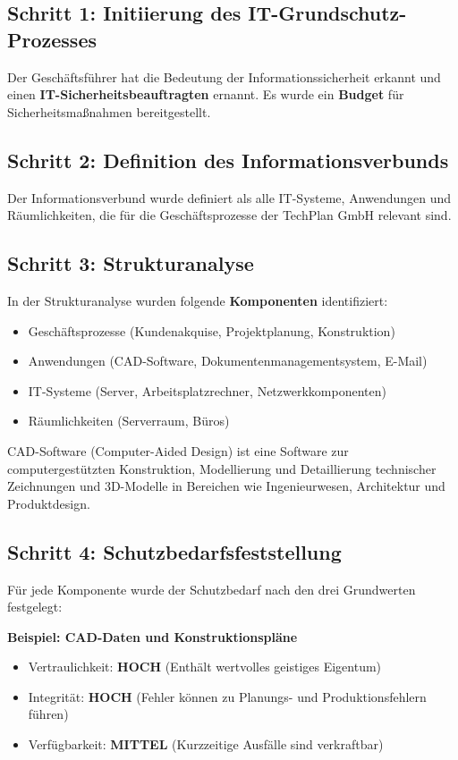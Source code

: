 \documentclass{orgstandard}
\begin{document}
\subsection{Schritt 1: Initiierung des IT-Grundschutz-Prozesses}
\label{sec:org8731209}
Der Geschäftsführer hat die Bedeutung der Informationssicherheit erkannt und einen \textbf{IT-Sicherheitsbeauftragten} ernannt. Es wurde ein \textbf{Budget} für Sicherheitsmaßnahmen bereitgestellt.
\subsection{Schritt 2: Definition des Informationsverbunds}
\label{sec:org49a1d9c}
Der Informationsverbund wurde definiert als alle IT-Systeme, Anwendungen und Räumlichkeiten, die für die Geschäftsprozesse der TechPlan GmbH relevant sind.
\subsection{Schritt 3: Strukturanalyse}
\label{sec:org8c9dd6d}
In der Strukturanalyse wurden folgende \textbf{Komponenten} identifiziert:
\begin{itemize}
\item Geschäftsprozesse (Kundenakquise, Projektplanung, Konstruktion)
\item Anwendungen (CAD-Software, Dokumentenmanagementsystem, E-Mail)
\item IT-Systeme (Server, Arbeitsplatzrechner, Netzwerkkomponenten)
\item Räumlichkeiten (Serverraum, Büros)
\end{itemize}

\begin{NOTES}
CAD-Software (Computer-Aided Design) ist eine Software zur computergestützten Konstruktion, Modellierung und Detaillierung technischer Zeichnungen und 3D-Modelle in Bereichen wie Ingenieurwesen, Architektur und Produktdesign.
\end{NOTES}
\subsection{Schritt 4: Schutzbedarfsfeststellung}
\label{sec:org20ff01e}

Für jede Komponente wurde der Schutzbedarf nach den drei Grundwerten festgelegt:

\textbf{Beispiel: CAD-Daten und Konstruktionspläne}
\begin{itemize}
\item Vertraulichkeit: \textbf{HOCH} (Enthält wertvolles geistiges Eigentum)
\item Integrität: \textbf{HOCH} (Fehler können zu Planungs- und Produktionsfehlern führen)
\item Verfügbarkeit: \textbf{MITTEL} (Kurzzeitige Ausfälle sind verkraftbar)
\end{itemize}
\end{document}
